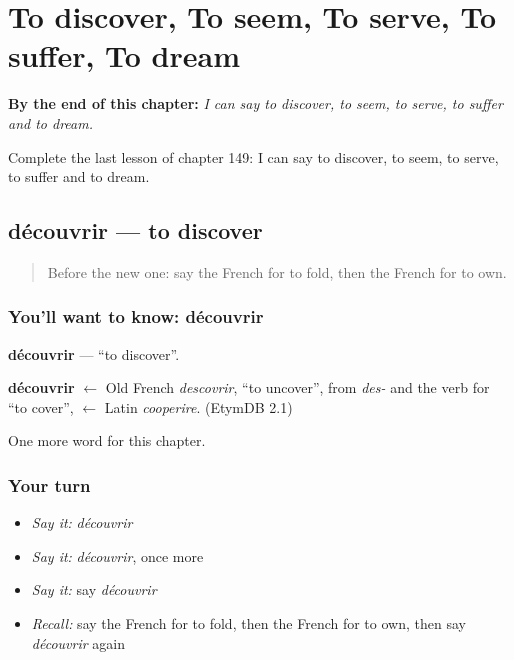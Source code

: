 
\chapter{To discover, To seem, To serve, To suffer, To dream}
\label{ch:fr-to-discover-to-seem-to-serve-to-suffer-to-dream}

\begin{chapteropening}
\textbf{By the end of this chapter:} \emph{I can say to discover, to seem, to serve, to suffer and to dream.}

Complete the last lesson of chapter 149: I can say to discover, to seem, to serve, to suffer and to dream.
\end{chapteropening}

\section[découvrir]{découvrir — to discover}

\label{lesson:FR-C149-decouvrir}



\begin{quote}
Before the new one: say the French for to fold, then the French for to own.
\end{quote}

\subsection*{You'll want to know: découvrir}
\textbf{découvrir} — \textquotedblleft{}to discover\textquotedblright{}.

\begin{cousinweb}
\textbf{découvrir} $\leftarrow$ Old French \emph{descovrir}, \textquotedblleft{}to uncover\textquotedblright{}, from \emph{des-} and the verb for \textquotedblleft{}to cover\textquotedblright{}, $\leftarrow$ Latin \emph{cooperire}. (EtymDB 2.1)
\end{cousinweb}

\begin{grammarlens}[title={What you've built}]
One more word for this chapter.
\end{grammarlens}

\subsection*{Your turn}
\begin{itemize}
\raggedright
  \item \emph{Say it:} \emph{découvrir}
  \item \emph{Say it:} \emph{découvrir}, once more
  \item \emph{Say it:} say \emph{découvrir}
  \item \emph{Recall:} say the French for to fold, then the French for to own, then say \emph{découvrir} again
\end{itemize}

